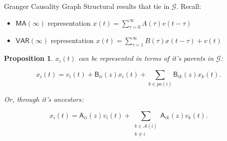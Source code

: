 \documentclass{beamer} %
\newtheorem*{proposition}{Proposition}
\def\gcg{\mathcal{G}}  %
\def\B{\mathsf{B}}  %
\def\A{\mathsf{A}}  %
\newcommand{\pa}[1]{pa(#1)}  %
\newcommand{\anc}[1]{\mathcal{A}(#1)}  %
\begin{document}
\begin{frame}{Granger Causality Graph}
  Structural results that tie in $\gcg$.  Recall:
  \begin{itemize}
    \item{$\mathsf{MA}(\infty)$ representation $x(t) = \sum_{\tau = 0}^\infty A(\tau)v(t - \tau)$}\pause
    \item{$\mathsf{VAR}(\infty)$ representation $x(t) = \sum_{\tau = 1}^\infty B(\tau)x(t - \tau) + v(t)$}\pause
  \end{itemize}

  \begin{proposition}
  $x_i(t)$ can be represented in terms of it's parents in $\gcg$:

  \begin{equation}
    \label{eqn:parent_expansion}
    x_i(t) = v_i(t) + \B_{ii}(z)x_i(t) + \sum_{k \in \pa{i}}\B_{ik}(z)x_k(t).
  \end{equation}\pause

  Or, through it's ancestors:

  \begin{equation}
    \label{eqn:ancestor_expansion}
    x_i(t) = \A_{ii}(z)v_i(t) + \sum_{\substack{k \in \anc{i} \\ k \ne i}}\A_{ik}(z)v_k(t).
  \end{equation}
    
  \end{proposition}
\end{frame}





\end{document}
